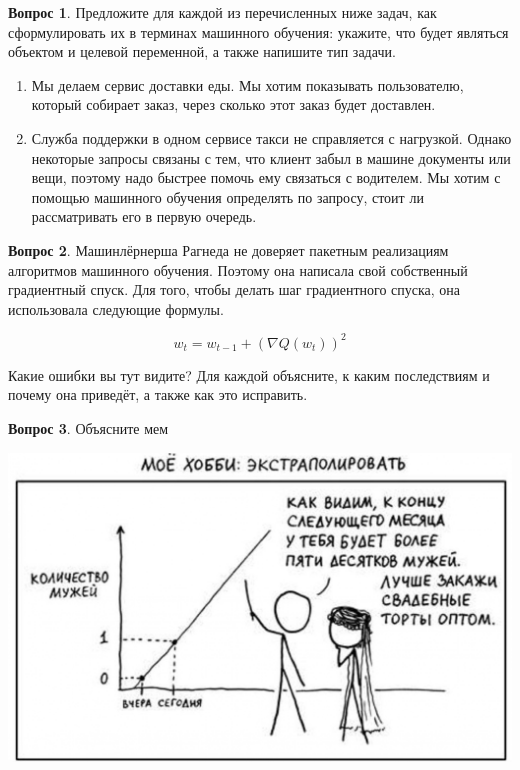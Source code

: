 \documentclass[12pt]{article}
\theoremstyle{definition}
\newtheorem{question}{Вопрос}
\begin{document}
\begin{question}
Предложите для каждой из перечисленных ниже задач, как сформулировать их в терминах машинного обучения: укажите, что будет являться объектом и целевой переменной, а также напишите тип задачи.

\begin{enumerate}
    \item Мы делаем сервис доставки еды. Мы хотим показывать пользователю, который собирает заказ, через сколько этот заказ будет доставлен. 

    \item Служба поддержки в одном сервисе такси не справляется с нагрузкой. Однако некоторые запросы связаны с тем, что клиент забыл в машине документы или вещи, поэтому надо быстрее помочь ему связаться с водителем. Мы хотим с помощью машинного обучения определять по запросу, стоит ли рассматривать его в первую очередь.
\end{enumerate}
\end{question}


\vspace{4cm} 


\begin{question}
Машинлёрнерша Рагнеда не доверяет пакетным реализациям алгоритмов машинного обучения. Поэтому она написала свой собственный градиентный спуск. Для того, чтобы делать шаг градиентного спуска, она использовала следующие формулы. 

\[
w_t = w_{t - 1} + (\nabla Q(w_{t}))^2
\]


Какие ошибки вы тут видите? Для каждой объясните, к каким последствиям и почему она приведёт, а также как это исправить.
\end{question}


\vspace{4cm} 
\newpage 

\begin{question}
Объясните мем
\begin{center}
  \includegraphics[scale=0.2]{mem1.jpg}
\end{center}
\end{question}
\end{document}
